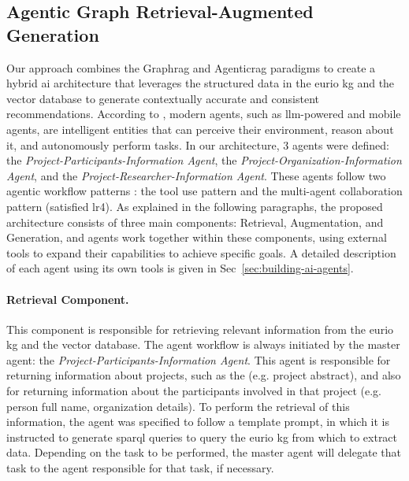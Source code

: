 \subsection*{Agentic Graph Retrieval-Augmented Generation}
Our approach combines the Graph\gls{rag} and Agentic\gls{rag} paradigms to create a hybrid \gls{ai} architecture that leverages the structured data in the \gls{eurio} \gls{kg} and the vector database to generate contextually accurate and consistent recommendations.
According to \cite{singh2025}, modern agents, such as \gls{llm}-powered and mobile agents, are intelligent entities that can perceive their environment, reason about it, and autonomously perform tasks.
In our architecture, 3 agents were defined: the \textit{Project-Participants-Information Agent}, the \textit{Project-Organization-Information Agent}, and the \textit{Project-Researcher-Information Agent}.
These agents follow two agentic workflow patterns \cite{singh2025}: the tool use pattern and the multi-agent collaboration pattern (satisfied \gls{lr}4).
As explained in the following paragraphs, the proposed architecture consists of three main components: Retrieval, Augmentation, and Generation, and agents work together within these components, using external tools to expand their capabilities to achieve specific goals.
A detailed description of each agent using its own tools is given in Sec~\ref{sec:building-ai-agents}.

\paragraph*{Retrieval Component.}
This component is responsible for retrieving relevant information from the \gls{eurio} \gls{kg} and the vector database.
The agent workflow is always initiated by the master agent: the \textit{Project-Participants-Information Agent}.
This agent is responsible for returning information about projects, such as the (e.g. project abstract), and also for returning information about the participants involved in that project (e.g. person full name, organization details).
To perform the retrieval of this information, the agent was specified to follow a template prompt, in which it is instructed to generate \gls{sparql} queries to query the \gls{eurio} \gls{kg} from which to extract data.
Depending on the task to be performed, the master agent will delegate that task to the agent responsible for that task, if necessary.

